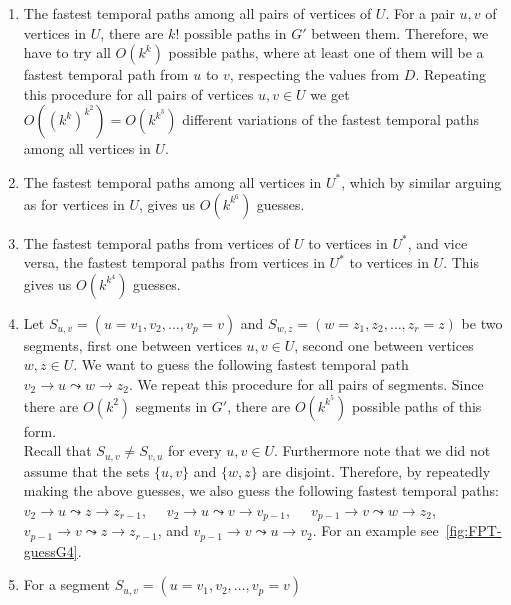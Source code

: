 \documentclass[11pt,a4paper]{article}
\theoremstyle{remark}
\theoremstyle{definition}
\newcommand{\deltaExact}{\textsc{Simple TGR}}
\begin{document}
\begin{enumerate}[G-1.]
    \item \label{FPT-guessFTPamongU}
    The fastest temporal paths among all pairs of vertices of $U$.
    For a pair $u,v$ of vertices in $U$, there are $k!$ possible paths in $G'$ between them. 
    Therefore, we have to try all $O(k^k)$ possible paths, where at least one of them will be a fastest temporal path from $u$ to $v$, respecting the values from $D$.
    Repeating this procedure for all pairs of vertices $u,v \in U$ we get $O((k^k)^{k^2})=O(k^{k^3})$ different variations of the fastest temporal paths among all vertices in $U$.
    \item \label{FPT-guessFTPamongUstar}
    The fastest temporal paths among all vertices in $U^*$, 
    which by similar arguing as for vertices in $U$, gives us $O(k^{k^6})$ guesses.
    \item \label{FPT-guessFTPamongUandUstar}
    The fastest temporal paths from vertices of $U$ to vertices in $U^*$,
    and vice versa, the fastest temporal paths from vertices in $U^*$ to vertices in $U$.
    This gives us $O(k^{k^4})$ guesses.
    \item \label{FPT-guessFTPamongv2z2}
    Let $S_{u,v} = (u=v_1,v_2, \dots, v_p = v)$ and $S_{w,z} = (w=z_1,z_2, \dots, z_r = z)$ be two segments,
    first one between vertices $u,v \in U$, second one between vertices $w, z \in U$.
    We want to guess the following fastest temporal path
    $v_2 \rightarrow u \leadsto w \rightarrow z_2$. 
    We repeat this procedure for all pairs of segments.
    Since there are $O(k^2)$ segments in $G'$,
    there are $O(k^{k^5})$ possible paths of this form. \\
    Recall that $S_{u,v}\neq S_{v,u}$ for every $u,v\in U$. Furthermore note that we did not assume that the sets $\{u,v\}$ and $\{w,z\}$ are disjoint. Therefore, by repeatedly making the above guesses, we also guess the following fastest temporal paths: 
    ${v_2 \rightarrow u \leadsto z \rightarrow z_{r-1}}$,\ \ \ 
    ${v_2 \rightarrow u \leadsto v \rightarrow v_{p-1}}$,\ \ \  
    ${v_{p-1} \rightarrow v \leadsto w \rightarrow z_{2}}$,\ \ \  
    ${v_{p-1} \rightarrow v \leadsto z \rightarrow z_{r-1}}$, and  
    ${v_{p-1} \rightarrow v \leadsto u \rightarrow v_{2}}$.
    For an example see~\cref{fig:FPT-guessG4}.
    \item \label{FPT:guess-uToSegmentz2}
    For a segment $S_{u,v} = (u=v_1,v_2, \dots, v_p = v)$

\end{enumerate}
\end{document}
